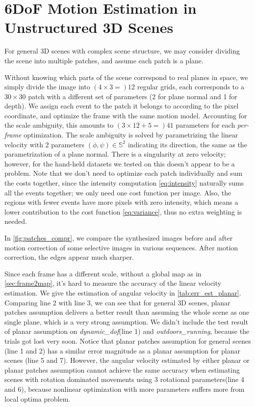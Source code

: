   \chapter{6DoF Motion Estimation in Unstructured 3D Scenes}
  \label{chap:general_scene}

  For general 3D scenes with complex scene structure, we may consider
  dividing the scene into multiple patches, and assume each patch is a
  plane.

  Without knowing which parts of the scene correspond to real planes
  in space, we simply divide the image into $(4\times3=)12$ regular
  grids, each corresponds to a $30\times30$ patch with a different set
  of parameters (2 for plane normal and 1 for depth). We assign each
  event to the patch it belongs to according to the pixel coordinate,
  and optimize the frame with the same motion model. Accounting for
  the scale ambiguity, this amounts to $(3\times12+5=)41$ parameters
  for each \textit{per-frame} optimization. The scale ambiguity is
  solved by parametrizing the linear velocity with 2 parameters
  $(\phi,\psi)\in\mathbb{S}^2$ indicating its direction, the same as
  the parametrization of a plane normal. There is a singularity at
  zero velocity; however, for the hand-held datasets we tested on this
  doesn't appear to be a problem.  Note that we don't need to optimize
  each patch individually and sum the costs together, since the
  intensity computation \cref{eq:intensity} naturally sums all the
  events together; we only need one cost function per image. Also, the
  regions with fewer events have more pixels with zero intensity,
  which means a lower contribution to the cost function
  \cref{eq:variance}, thus no extra weighting is needed.

  In \cref{fig:patches_compr}, we compare the synthesized images
  before and after motion correction of some selective images in
  various sequences. After motion correction, the edges appear much
  sharper.

  Since each frame has a different scale, without a global map as in
  \cref{sec:frame2map}, it's hard to measure the accuracy of the
  linear velocity estimation. We give the estimation of angular
  velocity in \cref{tab:err_est_planar}. Comparing line 2 with line 3,
  we can see that for general 3D scenes, planar patches assumption
  delivers a better result than assuming the whole scene as one single
  plane, which is a very strong assumption. We didn't include the test
  result of planar assumption on \emph{dynamic\_dof}(line 1) and
  \emph{outdoors\_running}, because the trials got lost very
  soon. Notice that planar patches assumption for general scenes (line
  1 and 2) has a similar error magnitude as a planar assumption for
  planar scenes (line 5 and 7). However, the angular velocity
  estimated by either planar or planar patches assumption cannot
  achieve the same accuracy when estimating scenes with rotation
  dominated movements using 3 rotational parameters(line 4 and 6),
  because nonlinear optimization with more parameters suffers more
  from local optima problem.

